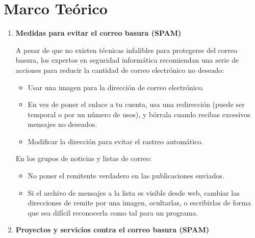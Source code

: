 \documentclass{article}
\begin{document}
\section{Marco Teórico}
\begin{enumerate}
		\item \textbf{Medidas para evitar el correo basura (SPAM)}

  A pesar de que no existen técnicas infalibles para protegerse del correo basura, los expertos en seguridad informática recomiendan una serie de acciones para reducir la cantidad de correo electrónico no deseado:

  \begin{itemize}
   \item Usar una imagen para la dirección de correo electrónico.
   \item En vez de poner el enlace a tu cuenta, usa una redirección (puede ser temporal o por un número de usos), y bórrala cuando recibas excesivos mensajes no deseados.
   \item Modificar la dirección para evitar el rastreo automático.
\end{itemize}

En los grupos de noticias y listas de correo:

\begin{itemize}
   \item No poner el remitente verdadero en las publicaciones enviados.
   \item Si el archivo de mensajes a la lista es visible desde web, cambiar las direcciones de remite por una imagen, ocultarlas, o escribirlas de forma que sea difícil reconocerla como tal para un programa.
\end{itemize}

\item \textbf{Proyectos y servicios contra el correo basura (SPAM)}


\end{enumerate}
\end{document}
